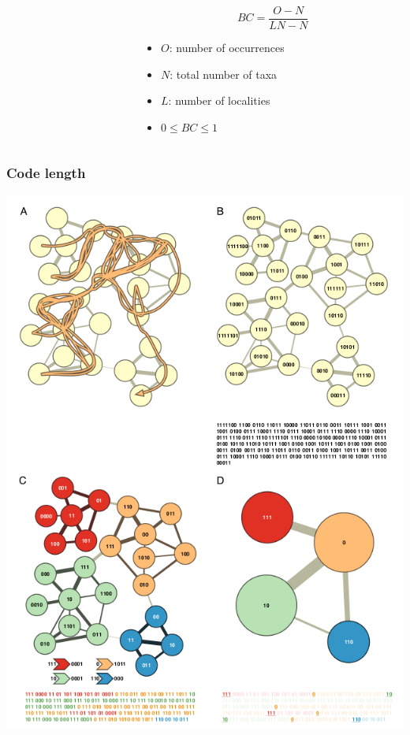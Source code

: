 \documentclass{beamer} \usepackage{amsmath,amsthm}
\begin{document}
\begin{frame}
\begin{columns}
\begin{column}{0.5\textwidth}
\begin{center}
        \tiny{}
      \end{center}
    \end{column}
    \begin{column}{0.5\textwidth}
      \[
        BC = \frac{O - N}{LN - N}
      \]

      \begin{itemize}
        \item \(O\): number of occurrences
        \item \(N\): total number of taxa
        \item \(L\): number of localities
        \item \(0 \leq BC \leq 1\)
      \end{itemize}
    \end{column}
  \end{columns}
\end{frame}

\begin{frame}
  \frametitle{Code length}
  \begin{center}
    \includegraphics[height=0.8\textheight,width=\textwidth,keepaspectratio=true]{figure/map}

    \tiny{}
  \end{center}

\end{frame}
\end{document}
